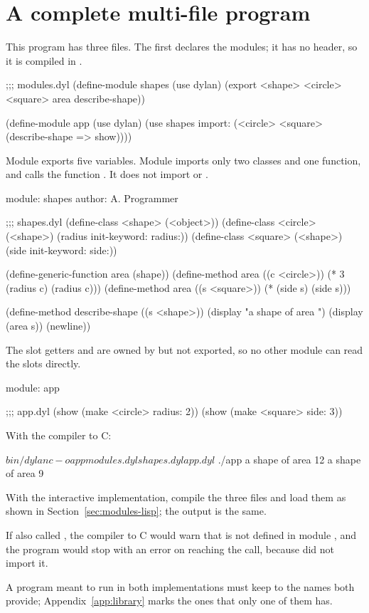 \section{A complete multi-file program}\label{sec:modules-example}

This program has three files. The first declares the modules; it has no
header, so it is compiled in .

\begin{dylan}
;;; modules.dyl
(define-module shapes
  (use dylan)
  (export <shape> <circle> <square> area describe-shape))

(define-module app
  (use dylan)
  (use shapes import: (<circle> <square> (describe-shape => show))))
\end{dylan}

\noindent
Module  exports five variables. Module  imports
only two classes and one function, and calls the function .
It does not import  or .

\begin{dylan}
module: shapes
author: A. Programmer

;;; shapes.dyl
(define-class <shape> (<object>))
(define-class <circle> (<shape>)
  (radius init-keyword: radius:))
(define-class <square> (<shape>)
  (side init-keyword: side:))

(define-generic-function area (shape))
(define-method area ((c <circle>)) (* 3 (radius c) (radius c)))
(define-method area ((s <square>)) (* (side s) (side s)))

(define-method describe-shape ((s <shape>))
  (display "a shape of area ")
  (display (area s))
  (newline))
\end{dylan}

\noindent
The slot getters  and  are owned by 
but not exported, so no other module can read the slots directly.

\begin{dylan}
module: app

;;; app.dyl
(show (make <circle> radius: 2))
(show (make <square> side: 3))
\end{dylan}

\noindent
With the compiler to C:

\begin{shell}
$ bin/dylanc -o app modules.dyl shapes.dyl app.dyl
$ ./app
a shape of area 12
a shape of area 9
\end{shell}

\noindent
With the interactive implementation, compile the three files and load
them as shown in Section~\ref{sec:modules-lisp}; the output is the same.

If  also called , the
compiler to C would warn that  is not defined in module
, and the program would stop with an error on reaching the
call, because  did not import it.

A program meant to run in both implementations must keep to the names
both provide; Appendix~\ref{app:library} marks the ones that only one of
them has.
